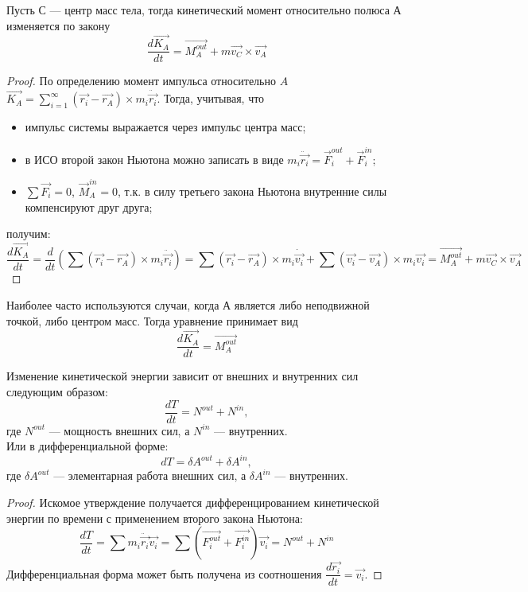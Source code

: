 \begin{theorem}
\hypertarget{theorem_delta_K}{}
    Пусть С --- центр масс тела, тогда кинетический момент относительно полюса А изменяется по закону
    \[
    \dfrac{d\vec{K_A}}{d t} = \vec{M_A^{out}} + m\vec{v_C} \times \vec{v_A}
    \]
\end{theorem}
\begin{proof}
    По определению момент импульса относительно $A$ $\vec{K_A} = \sum\limits_{i = 1}^{\infty} (\vec{r_i} - \vec{r_{A}}) \times m_i \ddot{\vec{r_i}}$. Тогда, учитывая, что
    \begin{itemize}
        \item импульс системы выражается через импульс центра масс;
        \item в ИСО второй закон Ньютона можно записать в виде $m_i\ddot{\vec{r_i}} = \vec{F}_i^{out} + \vec{F}_i^{in}$;
        \item $\sum \vec{F_i} = 0$, $\vec{M}_A^{in} = 0$, т.к. в силу третьего закона Ньютона внутренние силы компенсируют друг друга;
        
    \end{itemize}
    получим:
    \[
    \dfrac{d\vec{K_A}}{d t} = \dfrac{d}{d t} (\sum (\vec{r_i} - \vec{r_{A}}) \times m_i \ddot{\vec{r_i}}) = \sum (\vec{r_i} - \vec{r_{A}}) \times m_i \dot{\vec{v_i}} + \sum (\vec{v_i} - \vec{v_{A}}) \times m_i \vec{v_i} = \vec{M_A^{out}} + m\vec{v_C} \times \vec{v_A}
    \]
\end{proof}

Наиболее часто используются случаи, когда А является либо неподвижной точкой, либо центром масс. Тогда уравнение принимает вид
\[
\dfrac{d\vec{K_A}}{d t} = \vec{M_A^{out}}
\]

\begin{theorem}
    Изменение кинетической энергии зависит от внешних и внутренних сил следующим образом:
    \[
    \dfrac{d T}{d t} = N^{out} + N^{in},
    \]
    где $N^{out}$ --- мощность внешних сил, а $N^{in}$ --- внутренних.\\
    Или в дифференциальной форме:
    \[
    d T = \delta A^{out} + \delta A^{in},
    \]
    где $\delta A^{out}$ --- элементарная работа внешних сил, а $\delta A^{in}$ --- внутренних.
\end{theorem}
\begin{proof}
    Искомое утверждение получается дифференцированием кинетической энергии по времени с применением второго закона Ньютона:
    \[
    \dfrac{d T}{d t} = \sum m_i \ddot{\vec{r_i}} \vec{v_i} = \sum (\vec{F_i^{out}} + \vec{F_i^{in}}) \vec{v_i} = N^{out} + N^{in}
    \]
    Дифференциальная форма может быть получена из соотношения $\dfrac{d\vec{r_i}}{d t} = \vec{v_i}$.
\end{proof}



